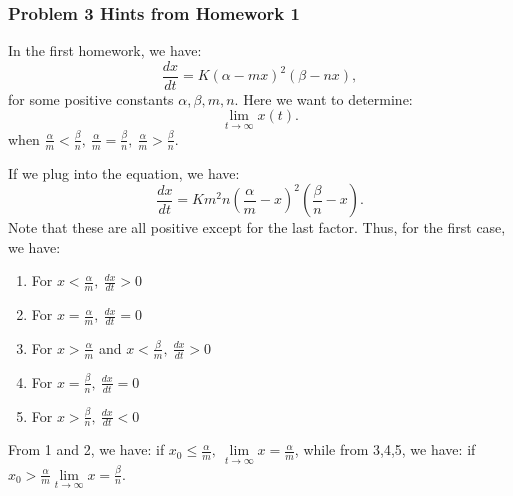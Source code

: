 \documentclass[../main/main.tex]{subfiles}
\begin{document}
\subsubsection{Problem 3 Hints from Homework 1}
In the first homework, we have: \[
	\frac{dx}{dt}=K\left( \alpha-mx \right) ^2\left( \beta-nx \right) 
,\] for some positive constants $\alpha,\beta,m,n$. 
Here we want to determine: \[
	\lim\limits_{t \to \infty} x(t)
.\] when  $
	\frac{\alpha}{m}<\frac{\beta}{n},\ 
	\frac{\alpha}{m}=\frac{\beta}{n},\ 
	\frac{\alpha}{m}>\frac{\beta}{n}
.$ 

If we plug into the equation, we have: \[
\frac{dx}{dt}=Km^2n\left( \frac{\alpha}{m}-x \right) ^2\left( \frac{\beta}{n}-x \right) 
.\] Note that these are all positive except for the last factor. Thus, for the first case, we have: 
\begin{enumerate}
	\item For $x<\frac{\alpha}{m},\ \frac{dx}{dt}>0$
	\item For $x=\frac{\alpha}{m},\ \frac{dx}{dt}=0$
	\item For $x>\frac{\alpha}{m}$ and $x<\frac{\beta}{m},\ \frac{dx}{dt}>0$
	\item For $x=\frac{\beta}{n},\ \frac{dx}{dt}=0$
	\item For $x>\frac{\beta}{n},\ \frac{dx}{dt}<0$
\end{enumerate}
From 1 and 2, we have: if $x_0\le \frac{\alpha}{m},\ \lim\limits_{t \to \infty} x = \frac{\alpha}{m}$, while from 3,4,5, we have: if $x_0>\frac{\alpha}{m}\lim\limits_{t \to \infty} x = \frac{\beta}{n}$.
\end{document}
